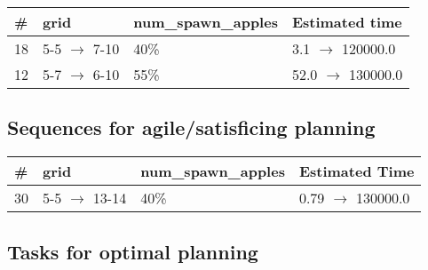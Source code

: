 \documentclass{article}
\begin{document}
                            \begin{center}
                            \begin{tabular}{@{}l|l|l|l@{}}
                            \# & grid & num\_spawn\_apples & Estimated time\\\midrule
                            18&5-5 $\rightarrow$ 7-10&40\%&3.1 $\rightarrow$ 120000.0\\
12&5-7 $\rightarrow$ 6-10&55\%&52.0 $\rightarrow$ 130000.0
                            \end{tabular}
                            \end{center}
                    
                         \subsection*{Sequences for agile/satisficing planning}

                        \begin{center}
                        \begin{tabular}{@{}l|l|l|l@{}}
                        \# & grid & num\_spawn\_apples & Estimated Time\\\midrule
                        30&5-5 $\rightarrow$ 13-14&40\%&0.79 $\rightarrow$ 130000.0
                        \end{tabular}
                        \end{center}
                    
                                \subsection*{Tasks for optimal planning}
                                
\end{document}
